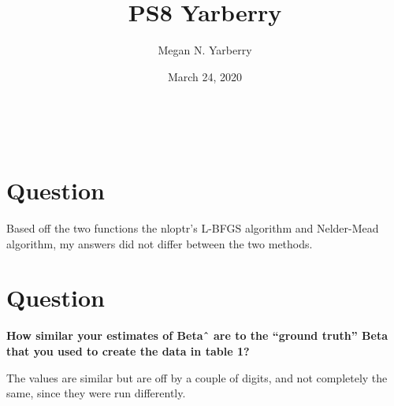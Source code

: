 \documentclass{article}
\title{PS8 Yarberry}
\author{Megan N. Yarberry }
\date{March 24, 2020}
\begin{document}
\maketitle
\
\section{Question}
Based off the two functions the nloptr’s L-BFGS algorithm and  Nelder-Mead algorithm, my answers did not differ between the two methods. 

\section{Question}
\textbf{How similar your estimates of Betaˆ  are to the “ground truth” Beta that you used to create the data in table 1?}

The values are similar but are off by a couple of digits, and not completely the same, since they were run differently. 
 
\end{document}
